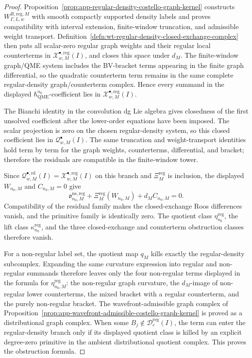 \begin{proof}
  Proposition~\ref{prop:app-regular-density-costello-graph-kernel}
  constructs \(W^{R,\mathrm{reg},M}_{\Gamma,L,w}\) with smooth compactly
  supported density labels and proves compatibility with interval
  extension, finite-window truncation, and admissible weight transport.
  Definition~\ref{defn:wt-regular-density-closed-exchange-complex} then
  puts all scalar-zero regular graph weights and their regular local
  counterterms in
  \(\mathcal X^{\bullet,\mathrm{reg}}_{w,M}(I)\), and closes this space
  under \(d_M\).  The finite-window graph/QME system includes the
  BV-bracket terms appearing in the finite graph differential, so the
  quadratic counterterm term remains in the same complete regular-density
  graph/counterterm complex.  Hence every summand in the displayed
  \(\hbar_{\mathrm{QME}}^{n_0}\)-coefficient lies in
  \(\mathcal X^{\bullet,\mathrm{reg}}_{w,M}(I)\).

  The Bianchi identity in the convolution dg Lie algebra gives closedness
  of the first unsolved coefficient after the lower-order equations have
  been imposed.  The scalar projection is zero on the chosen
  regular-density system, so this closed coefficient lies in
  \(\mathcal Q^\bullet_{w,M}(I)\).  The same truncation and
  weight-transport identities hold term by term for the graph weights,
  counterterms, differential, and bracket; therefore the residuals are
  compatible in the finite-window tower.

  Since
  \(\mathcal Q^{\bullet,\mathrm{rd}}_{w,M}(I)=
  \mathcal X^{\bullet,\mathrm{reg}}_{w,M}(I)\) on this branch and
  \(\Xi^{\mathrm{reg}}_M\) is inclusion, the displayed
  \(W_{n_0,M}\) and \(C_{n_0,M}=0\) give
  \[
    \mathfrak o^{\mathrm{ns,reg}}_{n_0,M}
      +\Xi^{\mathrm{reg}}_M(W_{n_0,M})
      +d_MC_{n_0,M}=0.
  \]
  Compatibility of the residual family makes the closed-exchange Roos
  differences vanish, and the primitive family is identically zero.  The
  quotient class \(\eta^{\mathrm{reg}}_{n_0}\), the lift class
  \(\kappa^{\mathrm{reg}}_{n_0}\), and the three closed-exchange and
  counterterm obstruction classes therefore vanish.

  For a non-regular label set, the quotient map \(q_M\) kills exactly
  the regular-density subcomplex.  Expanding the same curvature expression
  into regular and non-regular summands therefore leaves only the four
  non-regular terms displayed in the formula for
  \(\eta^{\mathrm{reg}}_{n_0,M}\): the non-regular graph curvature, the
  \(d_M\)-image of non-regular lower counterterms, the mixed bracket with
  a regular counterterm, and the purely non-regular bracket.  The
  wavefront-admissible graph complex of
  Proposition~\ref{prop:app-wavefront-admissible-costello-graph-kernel}
  is proved as a distributional graph complex.  When some
  \(B_j\notin\mathcal D^{\mathrm{reg}}_c(I)\), the term can enter the
  regular-density branch only if its displayed quotient class is killed
  by an explicit degree-zero primitive in the ambient distributional
  quotient complex.  This proves the obstruction formula.
\end{proof}

